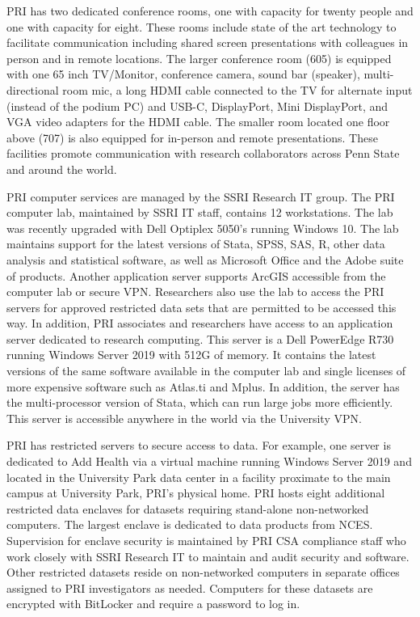 \documentclass[11pt]{article}
\begin{document}
\begin{itemize}
PRI has two dedicated conference rooms, one with capacity for twenty people and one with capacity for eight. These rooms include state of the art technology to facilitate communication including shared screen presentations with colleagues in person and in remote locations. The larger conference room (605) is equipped with one 65 inch TV/Monitor, conference camera, sound bar (speaker), multi-directional room mic, a long HDMI cable connected to the TV for alternate input (instead of the podium PC) and USB-C, DisplayPort, Mini DisplayPort, and VGA video adapters for the HDMI cable. The smaller room located one floor above (707) is also equipped for in-person and remote presentations. These facilities promote communication with research collaborators across Penn State and around the world.  

 

PRI computer services are managed by the SSRI Research IT group. The PRI computer lab, maintained by SSRI IT staff, contains 12 workstations. The lab was recently upgraded with Dell Optiplex 5050’s running Windows 10. The lab maintains support for the latest versions of Stata, SPSS, SAS, R, other data analysis and statistical software, as well as Microsoft Office and the Adobe suite of products. Another application server supports ArcGIS accessible from the computer lab or secure VPN. Researchers also use the lab to access the PRI servers for approved restricted data sets that are permitted to be accessed this way. In addition, PRI associates and researchers have access to an application server dedicated to research computing. This server is a Dell PowerEdge R730 running Windows Server 2019 with 512G of memory. It contains the latest versions of the same software available in the computer lab and single licenses of more expensive software such as Atlas.ti and Mplus. In addition, the server has the multi-processor version of Stata, which can run large jobs more efficiently. This server is accessible anywhere in the world via the University VPN.  

 

PRI has restricted servers to secure access to data. For example, one server is dedicated to Add Health via a virtual machine running Windows Server 2019 and located in the University Park data center in a facility proximate to the main campus at University Park, PRI’s physical home. PRI hosts eight additional restricted data enclaves for datasets requiring stand-alone non-networked computers. The largest enclave is dedicated to data products from NCES. Supervision for enclave security is maintained by PRI CSA compliance staff who work closely with SSRI Research IT to maintain and audit security and software. Other restricted datasets reside on non-networked computers in separate offices assigned to PRI investigators as needed. Computers for these datasets are encrypted with BitLocker and require a password to log in. 


\end{itemize}
\end{document}
